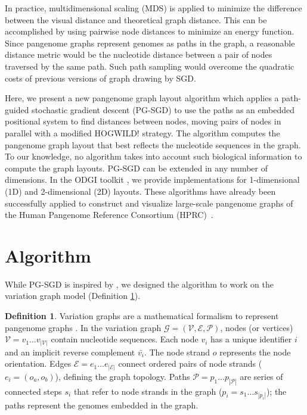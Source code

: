 \documentclass{bioinfo}
\theoremstyle{definition}
\newtheorem{definition}{Definition}[section]
\begin{document}
	In practice, multidimensional scaling (MDS) is applied to minimize the difference between the visual distance and theoretical graph distance.
	This can be accomplished by using pairwise node distances to minimize an energy function.
	Since pangenome graphs represent genomes as paths in the graph, a reasonable distance metric would be the nucleotide distance between a pair of nodes traversed by the same path. Such path sampling would overcome the quadratic costs of previous versions of graph drawing by SGD.
	
	Here, we present a new pangenome graph layout algorithm which applies a path-guided stochastic gradient descent (PG-SGD) to use the paths as an embedded positional system to find distances between nodes, moving pairs of nodes in parallel with a modified HOGWILD! strategy.
	The algorithm computes the pangenome graph layout that best reflects the nucleotide sequences in the graph.
	To our knowledge, no algorithm takes into account such biological information to compute the graph layouts.
	PG-SGD can be extended in any number of dimensions.
	In the ODGI toolkit \citep{Guarracino2022}, we provide implementations for 1-dimensional (1D) and 2-dimensional (2D) layouts.
	These algorithms have already been successfully applied to construct and visualize large-scale pangenome graphs of the Human Pangenome Reference Consortium (HPRC)~\citep{Liao2023, Guarracino2023}.

	\section{Algorithm}

	While PG-SGD is inspired by \cite{Zheng2019}, we designed the algorithm to work on the variation graph model (Definition \ref{def:vg}).
	
	\begin{definition}
		\label{def:vg}
		Variation graphs are a mathematical formalism to represent pangenome graphs \citep{Garrison_2019_thesis}.
		In the variation graph $\mathcal{G} = (\mathcal{V}, \mathcal{E}, \mathcal{P})$, nodes (or vertices) $\mathcal{V} = v_1\ldots v_{|\mathcal{V}|}$ contain nucleotide sequences.
		Each node $v_i$ has a unique identifier $i$ and an implicit reverse complement $\bar{v_i}$.
		The node strand $o$ represents the node orientation.
		Edges $\mathcal{E} = e_1\ldots e_{|\mathcal{E}|}$ connect ordered pairs of node strands ($e_i = ( o_a, o_b )$), defining the graph topology.
		Paths $\mathcal{P} = p_1\ldots p_{|\mathcal{P}|}$ are series of connected steps $s_i$ that refer to node strands in the graph ($p_i = s_1 \ldots s_{|p_i|}$); the paths represent the genomes embedded in the graph.
	\end{definition}
	
\end{document}
